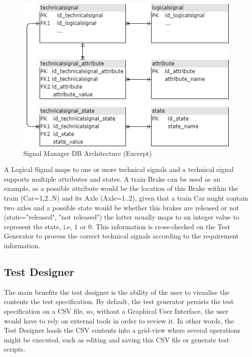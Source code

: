 \begin{figure}[H]
    \centering
    \includegraphics[scale=0.7]{images/signal_manager.png}
    \caption{Signal Manager DB Architecture (Excerpt)}
    \label{fig:db_signal_manager}
\end{figure}

A Logical Signal maps to one or more technical signals and a technical signal supports multiple attributes and states. A train Brake can be used as an example, as a possible attribute would be the location of this Brake within the train (Car=1,2..N) and its Axle (Axle=1..2), given that a train Car might contain two axles and a possible state would be whether this brakes are released or not (state="released", "not released") the latter usually maps to an integer value to represent the state, i.e, 1 or 0. This information is cross-checked on the Test Generator to process the correct technical signals according to the requirement information.


\subsection{Test Designer}
\label{subsec:method_signal_manager}

The main benefits the test designer is the ability of the user to visualise the contents the test specification. By default, the test generator persists the test specification on a CSV file, so, without a Graphical User Interface, the user would have to rely on external tools in order to review it. In other words, the Test Designer loads the CSV contents into a grid-view where several operations might be executed, such as editing and saving this CSV file or generate test scripts.
